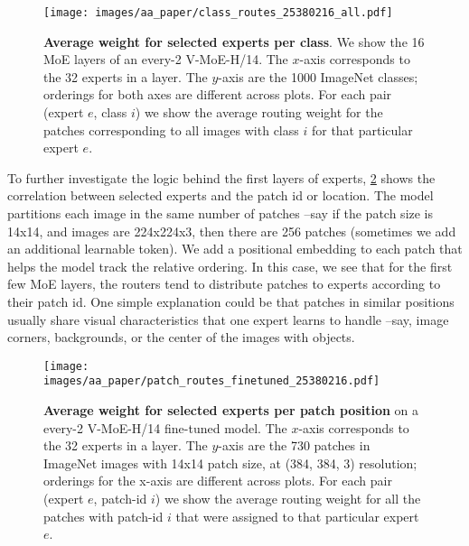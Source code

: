 \documentclass{article}
\newcommand{\abbv}{{V-MoE}}
\begin{document}
\begin{figure}[h]
\centering
\texttt{[image: images/aa\_paper/class\_routes\_25380216\_all.pdf]}
\caption{
\textbf{Average weight for selected experts per class}.
We show the 16 MoE layers of an every-2 \abbv{}-H/14. The $x$-axis corresponds to the 32 experts in a layer. The $y$-axis are the 1000 ImageNet classes; orderings for both axes are different across plots.
For each pair (expert $e$, class $i$) we show the average routing weight for the patches corresponding to all images with class $i$ for that particular expert $e$.}
\label{im:routes_class_experts_all}
\end{figure}

To further investigate the logic behind the first layers of experts, \cref{im:routes_patch_experts} shows the correlation between selected experts and the patch id or location.
The model partitions each image in the same number of patches --say if the patch size is 14x14, and images are 224x224x3, then there are 256 patches (sometimes we add an additional learnable token).
We add a positional embedding to each patch that helps the model track the relative ordering.
In this case, we see that for the first few MoE layers, the routers tend to distribute patches to experts according to their patch id.
One simple explanation could be that patches in similar positions usually share visual characteristics that one expert learns to handle --say, image corners, backgrounds, or the center of the images with objects.

\begin{figure}[h]
\centering
\texttt{[image: images/aa\_paper/patch\_routes\_finetuned\_25380216.pdf]}
\caption{
\textbf{Average weight for selected experts per patch position} on a every-2 \abbv{}-H/14 fine-tuned model.
The $x$-axis corresponds to the 32 experts in a layer. The $y$-axis are the 730 patches in ImageNet images with 14x14 patch size, at (384, 384, 3) resolution; orderings for the x-axis are different across plots.
For each pair (expert $e$, patch-id $i$) we show the average routing weight for all the patches with patch-id $i$ that were assigned to that particular expert $e$.}
\label{im:routes_patch_experts}
\end{figure}
\end{document}
